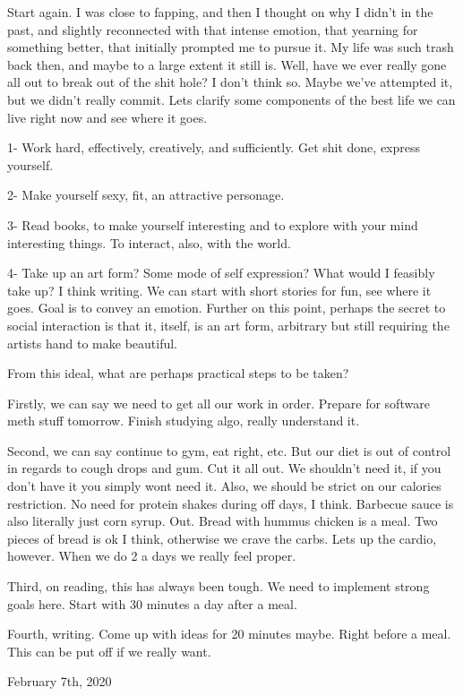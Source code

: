 \qquad Start again. I was close to fapping, and then I thought on why I
didn't in the past, and slightly reconnected with that intense emotion,
that yearning for something better, that initially prompted me to pursue
it. My life was such trash back then, and maybe to a large extent it
still is. Well, have we ever really gone all out to break out of the
shit hole? I don't think so. Maybe we've attempted it, but we didn't
really commit. Lets clarify some components of the best life we can live
right now and see where it goes.

1- Work hard, effectively, creatively, and sufficiently. Get shit done,
express yourself.

2- Make yourself sexy, fit, an attractive personage.

3- Read books, to make yourself interesting and to explore with your
mind interesting things. To interact, also, with the world.

4- Take up an art form? Some mode of self expression? What would I
feasibly take up? I think writing. We can start with short stories for
fun, see where it goes. Goal is to convey an emotion. Further on this
point, perhaps the secret to social interaction is that it, itself, is
an art form, arbitrary but still requiring the artists hand to make
beautiful.

From this ideal, what are perhaps practical steps to be taken?

Firstly, we can say we need to get all our work in order. Prepare for
software meth stuff tomorrow. Finish studying algo, really understand
it.

Second, we can say continue to gym, eat right, etc. But our diet is out
of control in regards to cough drops and gum. Cut it all out. We
shouldn't need it, if you don't have it you simply wont need it. Also,
we should be strict on our calories restriction. No need for protein
shakes during off days, I think. Barbecue sauce is also literally just
corn syrup. Out. Bread with hummus chicken is a meal. Two pieces of
bread is ok I think, otherwise we crave the carbs. Lets up the cardio,
however. When we do 2 a days we really feel proper.

Third, on reading, this has always been tough. We need to implement
strong goals here. Start with 30 minutes a day after a meal.

Fourth, writing. Come up with ideas for 20 minutes maybe. Right before a
meal. This can be put off if we really want.

\bigskip
\bigskip
February 7th, 2020

